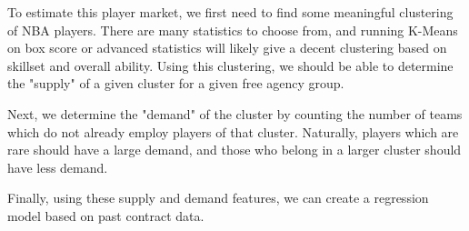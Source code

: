 \documentclass{article}
\begin{document}
To estimate this player market, we first need to find some meaningful clustering of NBA players. There are many statistics to choose from, and running K-Means on box score or advanced statistics will likely give a decent clustering based on skillset and overall ability. Using this clustering, we should be able to determine the "supply" of a given cluster for a given free agency group.

Next, we determine the "demand" of the cluster by counting the number of teams which do not already employ players of that cluster. Naturally, players which are rare should have a large demand, and those who belong in a larger cluster should have less demand.

Finally, using these supply and demand features, we can create a regression model based on past contract data.
\end{document}
